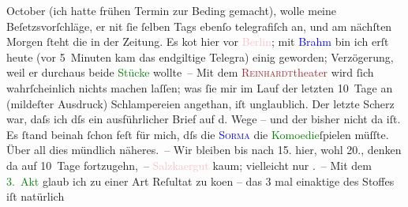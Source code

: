                   October (ich hatte frühen Termin zur Beding gemacht), wolle meine
               Beſetzsvorſchläge, er ni{\geminationm}t ſie ſelben Tags ebenſo
               telegrafiſch an, und am nächſten Morgen ſteht die \label{K_L01545_2v}\label{K_L01545_2h} in der Zeitung. Es ko{\geminationm}t hier vor \textcolor{pink}{Berlin}{}\ledrightnote{\textcolor{pink}{Berlin}}; mit
                  \textcolor{blue}{Brahm}{}\ledrightnote{\textcolor{blue}{Otto Brahm}} bin ich erſt heute (vor 5 Minuten kam
               das endgiltige Telegra{\geminationm}) einig geworden; Verzögerung,
               weil er durchaus beide \textcolor{green}{Stücke}{} wollte – Mit dem \textcolor{brown}{\textsc{Reinhardt}theater}{} wird ſich wahr{\pb}ſcheinlich nichts machen laſſen; was ſie mir im Lauf der
               letzten 10 Tage an (mildeſter Ausdruck) Schlampereien angethan, iſt unglaublich. Der
               letzte Scherz war, daſs ich \label{K_L01545_3v}\label{K_L01545_3h} dſs ein ausführlicher Brief auf d. Wege – und der bisher nicht da
               iſt. Es ſtand beinah ſchon feſt für mich, dſs die \textcolor{blue}{\textsc{Sorma}}{}\ledrightnote{\textcolor{blue}{Agnes Sorma}} die \textcolor{green}{Komoedie}{}ſpielen müſſte. Über all dies mündlich
               näheres. –\pend
           \pstart
           Wir bleiben bis nach 15. hier, wohl 20., denken da{\geminationn} auf 10 Tage fortzugehn, – \textcolor{pink}{Salzka{\geminationm}ergut}{}\ledrightnote{\textcolor{pink}{Salzkammergut}} kaum; vielleicht nur {\pb}\label{K_L01545_4v}\label{K_L01545_4h}. – Mit dem \textcolor{green}{3. Akt}{} glaub ich zu einer Art Reſultat zu ko{\geminationm}en – das 3 mal einaktige des Stoffes iſt natürlich
